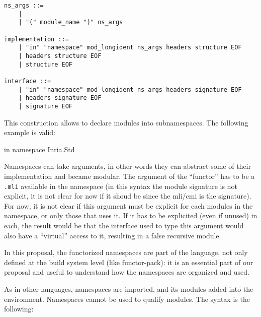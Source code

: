 \documentclass[11pt,a4paper]{article}
\begin{document}
\begin{verbatim}
ns_args ::=
    | 
    | "(" module_name ")" ns_args

implementation ::=
    | "in" "namespace" mod_longident ns_args headers structure EOF
    | headers structure EOF
    | structure EOF

interface ::=
    | "in" "namespace" mod_longident ns_args headers signature EOF
    | headers signature EOF
    | signature EOF
\end{verbatim}

This construction allows to declare modules into subnamespaces. The following
example is valid:

\begin{OCaml}
in namespace Inria.Std
\end{OCaml}

Namespaces can take arguments, in other words they can abstract some of their
implementation and became modular. The argument of the ``functor'' has to be a
\texttt{.mli} available in the namespace (in this syntax the module signature is
not explicit, it is not clear for now if it shoud be since the mli/cmi is the
signature). For now, it is not clear if this argument must be explicit for each
modules in the namespace, or only those that uses it. If it has to be explicited
(even if unused) in each, the result would be that the interface used to type
this argument would also have a ``virtual'' access to it, resulting in a false
recursive module.

In this proposal, the functorized namespaces are part of the language, not only
defined at the build system level (like functor-pack): it is an essential part
of our proposal and useful to understand how the namespaces are organized and
used.

\medskip

As in other languages, namespaces are imported, and its modules added into the
environment. Namespaces cannot be used to qualify modules. The syntax is the
following:
\end{document}
